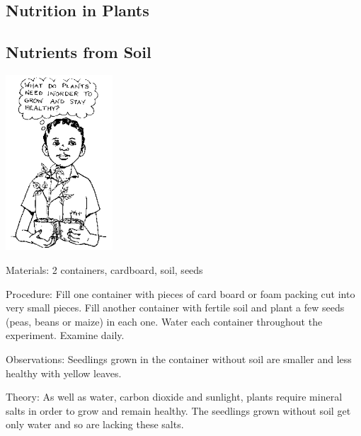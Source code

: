 \begin{multicols}{2}

\section*{Nutrition in Plants}


\subsection{Nutrients from Soil} %

\begin{center}
\includegraphics[width=0.3\textwidth]{./img/source/nutrients-plants.png}
\end{center}

\begin{description*}
\item[Materials:]{2 containers, cardboard, soil, seeds}
\item[Procedure:]{Fill one container with pieces of card board or foam packing cut
into very small pieces. Fill another container with fertile soil and plant a few seeds (peas,
beans or maize) in each one. Water each container throughout the experiment. Examine daily.}
\item[Observations:]{Seedlings grown in the container without soil are smaller and less healthy with yellow leaves.}
\item[Theory:]{As well as water, carbon dioxide and sunlight, plants require mineral salts in order to grow
and remain healthy. The seedlings grown without soil get only water and so are lacking these
salts.}
\end{description*}


\end{multicols}
